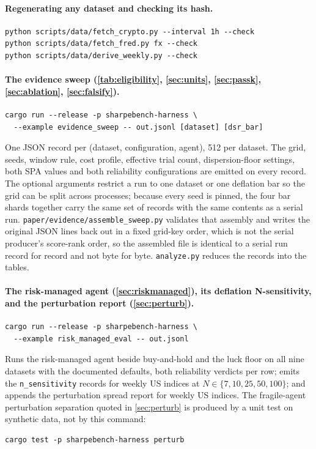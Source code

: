 \paragraph{Regenerating any dataset and checking its hash.}
\begin{verbatim}
python scripts/data/fetch_crypto.py --interval 1h --check
python scripts/data/fetch_fred.py fx --check
python scripts/data/derive_weekly.py --check
\end{verbatim}

\paragraph{The evidence sweep (\cref{tab:eligibility}, \cref{sec:units}, \cref{sec:passk}, \cref{sec:ablation}, \cref{sec:falsify}).}
\begin{verbatim}
cargo run --release -p sharpebench-harness \
  --example evidence_sweep -- out.jsonl [dataset] [dsr_bar]
\end{verbatim}
One JSON record per (dataset, configuration, agent), 512 per dataset. The grid, seeds, window rule, cost profile, effective trial count, dispersion-floor settings, both SPA values and both reliability configurations are emitted on every record. The optional arguments restrict a run to one dataset or one deflation bar so the grid can be split across processes; because every seed is pinned, the four bar shards together carry the same set of records with the same contents as a serial run. \texttt{paper/evidence/assemble\_sweep.py} validates that assembly and writes the original JSON lines back out in a fixed grid-key order, which is not the serial producer's score-rank order, so the assembled file is identical to a serial run record for record and not byte for byte. \texttt{analyze.py} reduces the records into the tables.

\paragraph{The risk-managed agent (\cref{sec:riskmanaged}), its deflation N-sensitivity, and the perturbation report (\cref{sec:perturb}).}
\begin{verbatim}
cargo run --release -p sharpebench-harness \
  --example risk_managed_eval -- out.jsonl
\end{verbatim}
Runs the risk-managed agent beside buy-and-hold and the luck floor on all nine datasets with the documented defaults, both reliability verdicts per row; emits the \texttt{n\_sensitivity} records for weekly US indices at $N \in \{7, 10, 25, 50, 100\}$; and appends the perturbation spread report for weekly US indices. The fragile-agent perturbation separation quoted in \cref{sec:perturb} is produced by a unit test on synthetic data, not by this command:
\begin{verbatim}
cargo test -p sharpebench-harness perturb
\end{verbatim}


